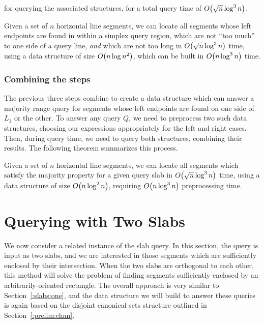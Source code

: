 \noindent
for querying the associated structures, for a total query time of $O\!\left(\sqrt{n} \log^3{n}\right)$. 

\begin{lemma}
\label{lem:slabs:one:step3}
Given a set of $n$ horizontal line segments, we can locate all segments whose left endpoints are found in within a simplex query region, which are not ``too much'' to one side of a query line, \emph{and} which are not too long in $O\!\left(\sqrt{n}\log^3{n}\right)$ time, using a data structure of size $O\!\left(n\log{n}^2\right)$, which can be built in $O\!\left(n\log^3{n}\right)$ time.
\end{lemma}

\subsubsection{Combining the steps}

The previous three steps combine to create a data structure which can answer a majority range query for segments whose left endpoints are found on one side of $L_1$ or the other.
To answer any query $Q$, we need to preprocess two such data structures, choosing our expressions appropriately for the left and right cases.
Then, during query time, we need to query both structures, combining their results.
The following theorem summarizes this process.

\begin{theorem}
\label{thm:slabs:one}
Given a set of $n$ horizontal line segments, we can locate all segments which satisfy the majority property for a given query slab in $O\!\left(\sqrt{n}\log^3{n}\right)$ time, using a data structure of size $O\!\left(n\log^2{n}\right)$, requiring $O\!\left(n\log^3{n}\right)$ preprocessing time.
\end{theorem}


\section{Querying with Two Slabs}
\label{:slabs:two}

We now consider a related instance of the slab query. In this section, the query is input as two slabs, and we are interested in those segments which are sufficiently enclosed by their intersection. When the two slabs are orthogonal to each other, this method will solve the problem of finding segments sufficiently enclosed by an arbitrarily-oriented rectangle.  The overall approach is very similar to Section~\ref{:slabs:one}, and the data structure we will build to answer these queries is again based on the disjoint canonical sets structure outlined in Section~\ref{:prelim:chan}.


